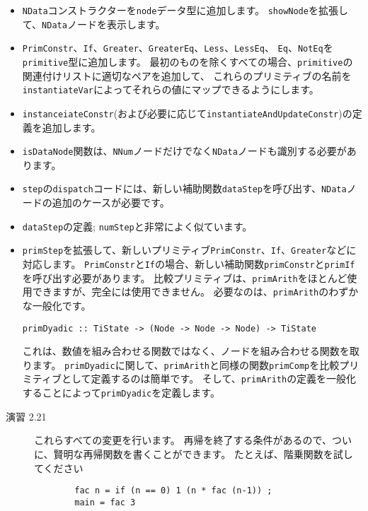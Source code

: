 \documentclass{jarticle}
\begin{document}
\begin{itemize}
	\item \texttt{NData}コンストラクターを\texttt{node}データ型に追加します。
	      \texttt{showNode}を拡張して、\texttt{NData}ノードを表示します。
	\item \texttt{PrimConstr}、\texttt{If}、\texttt{Greater}、\texttt{GreaterEq}、\texttt{Less}、\texttt{LessEq}、
	      \texttt{Eq}、\texttt{NotEq}を\texttt{primitive}型に追加します。
	      最初のものを除くすべての場合、\texttt{primitive}の関連付けリストに適切なペアを追加して、
	      これらのプリミティブの名前を\texttt{instantiateVar}によってそれらの値にマップできるようにします。
	\item \texttt{instanceiateConstr}(および必要に応じて\texttt{instantiateAndUpdateConstr})の定義を追加します。
	\item \texttt{isDataNode}関数は、\texttt{NNum}ノードだけでなく\texttt{NData}ノードも識別する必要があります。
	\item \texttt{step}の\texttt{dispatch}コードには、新しい補助関数\texttt{dataStep}を呼び出す、\texttt{NData}ノードの追加のケースが必要です。
	\item \texttt{dataStep}の定義; \texttt{numStep}と非常によく似ています。
	\item \texttt{primStep}を拡張して、新しいプリミティブ\texttt{PrimConstr}、\texttt{If}、\texttt{Greater}などに対応します。
	      \texttt{PrimConstr}と\texttt{If}の場合、新しい補助関数\texttt{primConstr}と\texttt{primIf}を呼び出す必要があります。
	      比較プリミティブは、\texttt{primArith}をほとんど使用できますが、完全には使用できません。
	      必要なのは、\texttt{primArith}のわずかな一般化です。
	      \begin{verbatim}
primDyadic :: TiState -> (Node -> Node -> Node) -> TiState
\end{verbatim}
	      これは、数値を組み合わせる関数ではなく、ノードを組み合わせる関数を取ります。
	      \texttt{primDyadic}に関して、\texttt{primArith}と同様の関数\texttt{primComp}を比較プリミティブとして定義するのは簡単です。
	      そして、\texttt{primArith}の定義を一般化することによって\texttt{primDyadic}を定義します。
\end{itemize}

\begin{description}
	\item[演習 2.21] これらすべての変更を行います。
	      再帰を終了する条件があるので、ついに、賢明な再帰関数を書くことができます。
	      たとえば、階乗関数を試してください
	      \begin{verbatim}
        fac n = if (n == 0) 1 (n * fac (n-1)) ;
        main = fac 3
\end{verbatim}
\end{description}
\end{document}
